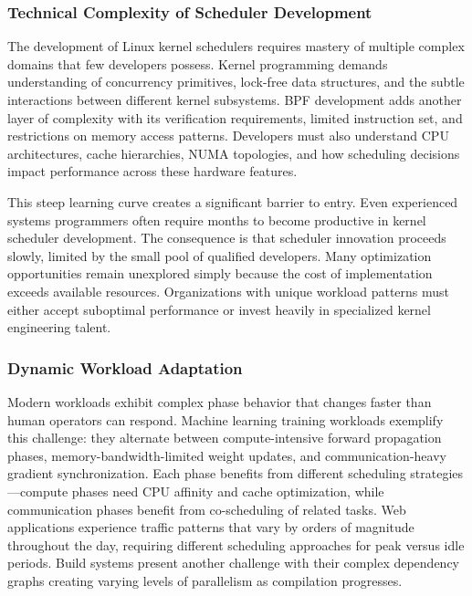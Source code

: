 \subsubsection{Technical Complexity of Scheduler Development}

The development of Linux kernel schedulers requires mastery of multiple complex domains that few developers possess. Kernel programming demands understanding of concurrency primitives, lock-free data structures, and the subtle interactions between different kernel subsystems. BPF development adds another layer of complexity with its verification requirements, limited instruction set, and restrictions on memory access patterns. Developers must also understand CPU architectures, cache hierarchies, NUMA topologies, and how scheduling decisions impact performance across these hardware features.

This steep learning curve creates a significant barrier to entry. Even experienced systems programmers often require months to become productive in kernel scheduler development. The consequence is that scheduler innovation proceeds slowly, limited by the small pool of qualified developers. Many optimization opportunities remain unexplored simply because the cost of implementation exceeds available resources. Organizations with unique workload patterns must either accept suboptimal performance or invest heavily in specialized kernel engineering talent.

\subsubsection{Dynamic Workload Adaptation}

Modern workloads exhibit complex phase behavior that changes faster than human operators can respond. Machine learning training workloads exemplify this challenge: they alternate between compute-intensive forward propagation phases, memory-bandwidth-limited weight updates, and communication-heavy gradient synchronization. Each phase benefits from different scheduling strategies—compute phases need CPU affinity and cache optimization, while communication phases benefit from co-scheduling of related tasks. Web applications experience traffic patterns that vary by orders of magnitude throughout the day, requiring different scheduling approaches for peak versus idle periods. Build systems present another challenge with their complex dependency graphs creating varying levels of parallelism as compilation progresses.

